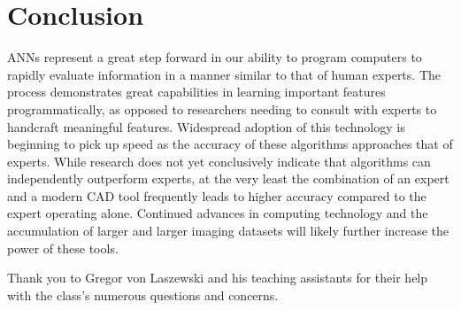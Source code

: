 \documentclass[sigconf]{acmart}
\begin{document}
\section{Conclusion}

ANNs represent a great step forward in our ability to program computers to rapidly evaluate information in a manner similar to that of human experts. The process demonstrates great capabilities in learning important features programmatically, as opposed to researchers needing to consult with experts to handcraft meaningful features. Widespread adoption of this technology is beginning to pick up speed as the accuracy of these algorithms approaches that of experts. While research does not yet conclusively indicate that algorithms can independently outperform experts, at the very least the combination of an expert and a modern CAD tool frequently leads to higher accuracy compared to the expert operating alone. Continued advances in computing technology and the accumulation of larger and larger imaging datasets will likely further increase the power of these tools.

\begin{acks}

Thank you to Gregor von Laszewski and his teaching assistants for their help with the class's numerous questions and concerns.
  
\end{acks}


 
\end{document}
